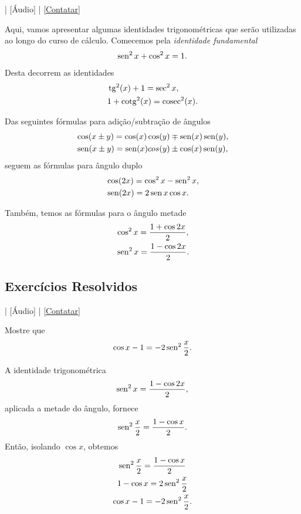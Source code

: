 \begin{flushright}
  [Vídeo] | [Áudio] | \href{https://phkonzen.github.io/notas/contato.html}{[Contatar]}
\end{flushright}

Aqui, vamos apresentar algumas identidades trigonométricas que serão utilizadas ao longo do curso de cálculo. Comecemos pela \emph{identidade fundamental}
\begin{equation}
  \operatorname{sen}^2 x + \cos^2 x = 1.
\end{equation}
Desta decorrem as identidades
\begin{align}
  &\operatorname{tg}^2(x) + 1 = \sec^2 x,\\
  &1 + \operatorname{cotg}^2(x) = \operatorname{cosec}^2(x).
\end{align}

Das seguintes fórmulas para adição/subtração de ângulos
\begin{align}
  &\cos(x\pm y) = \cos(x)\cos(y) \mp \operatorname{sen}(x)\operatorname{sen}(y),\\
  &\operatorname{sen}(x\pm y) = \operatorname{sen}(x)cos(y) \pm \cos(x)\operatorname{sen}(y),
\end{align}
seguem as fórmulas para ângulo duplo
\begin{align}
  &\cos(2x) = \cos^2x - \operatorname{sen}^2x,\\
  &\operatorname{sen}(2x) = 2\operatorname{sen} x\cos x.
\end{align}

Também, temos as fórmulas para o ângulo metade
\begin{align}
  &\cos^2 x = \frac{1 + \cos 2x}{2},\\
  &\operatorname{sen}^2 x = \frac{1 - \cos 2x}{2}.\label{eq:id_trig_cos_x2}
\end{align}

\subsection*{Exercícios Resolvidos}

\begin{flushright}
  [Vídeo] | [Áudio] | \href{https://phkonzen.github.io/notas/contato.html}{[Contatar]}
\end{flushright}

\begin{exeresol}
  Mostre que
  \begin{equation}
    \cos x - 1 = -2\operatorname{sen}^2 \frac{x}{2}.
  \end{equation}
\end{exeresol}
\begin{resol}
  A identidade trigonométrica
  \begin{equation}
    \operatorname{sen}^2 x = \frac{1 - \cos 2x}{2},
  \end{equation}
  aplicada a metade do ângulo, fornece
  \begin{equation}
    \operatorname{sen}^2 \frac{x}{2} = \frac{1 - \cos x}{2}.
  \end{equation}
  Então, isolando $\cos x$, obtemos
  \begin{gather}
    \operatorname{sen}^2 \frac{x}{2} = \frac{1 - \cos x}{2}\\
    1 - \cos x = 2\operatorname{sen}^2 \frac{x}{2}\\
    \cos x - 1 = -2\operatorname{sen}^2 \frac{x}{2}.
  \end{gather}
\end{resol}

